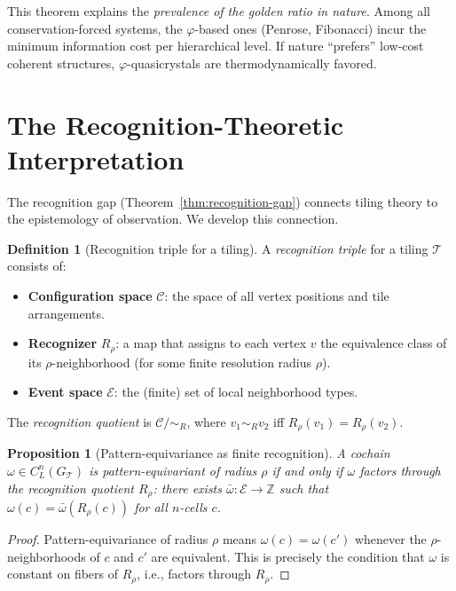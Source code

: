 \documentclass[12pt]{article}
\newtheorem{proposition}[theorem]{Proposition}
\theoremstyle{definition}
\newtheorem{definition}[theorem]{Definition}
\theoremstyle{remark}
\newcommand{\ZZ}{\mathbb{Z}}
\begin{document}
This theorem explains the \emph{prevalence of the golden ratio in nature}. Among all conservation-forced systems, the $\varphi$-based ones (Penrose, Fibonacci) incur the minimum information cost per hierarchical level. If nature ``prefers'' low-cost coherent structures, $\varphi$-quasicrystals are thermodynamically favored.


\section{The Recognition-Theoretic Interpretation}
\label{sec:recognition}

The recognition gap (Theorem~\ref{thm:recognition-gap}) connects tiling theory to the epistemology of observation. We develop this connection.

\begin{definition}[Recognition triple for a tiling]
\label{def:recognition-triple}
A \emph{recognition triple} for a tiling $\mathcal{T}$ consists of:
\begin{itemize}
\item \textbf{Configuration space} $\mathcal{C}$: the space of all vertex positions and tile arrangements.
\item \textbf{Recognizer} $R_\rho$: a map that assigns to each vertex $v$ the equivalence class of its $\rho$-neighborhood (for some finite resolution radius $\rho$).
\item \textbf{Event space} $\mathcal{E}$: the (finite) set of local neighborhood types.
\end{itemize}
The \emph{recognition quotient} is $\mathcal{C}/\!\sim_R$, where $v_1 \sim_R v_2$ iff $R_\rho(v_1) = R_\rho(v_2)$.
\end{definition}

\begin{proposition}[Pattern-equivariance as finite recognition]
\label{prop:PE-recognition}
A cochain $\omega \in C^n_L(G_{\mathcal{T}})$ is pattern-equivariant of radius $\rho$ if and only if $\omega$ factors through the recognition quotient $R_\rho$: there exists $\bar{\omega}: \mathcal{E} \to \ZZ$ such that $\omega(c) = \bar{\omega}(R_\rho(c))$ for all $n$-cells $c$.
\end{proposition}

\begin{proof}
Pattern-equivariance of radius $\rho$ means $\omega(c) = \omega(c')$ whenever the $\rho$-neighborhoods of $c$ and $c'$ are equivalent. This is precisely the condition that $\omega$ is constant on fibers of $R_\rho$, i.e., factors through $R_\rho$.
\end{proof}
\end{document}

